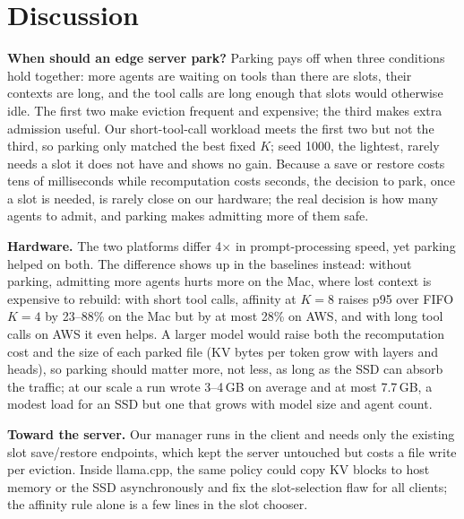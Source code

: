 \documentclass[conference,letterpaper]{IEEEtran}
\begin{document}
\section{Discussion}
\textbf{When should an edge server park?} Parking pays off when three conditions hold together: more agents are waiting on tools than there are slots, their contexts are long, and the tool calls are long enough that slots would otherwise idle. The first two make eviction frequent and expensive; the third makes extra admission useful. Our short-tool-call workload meets the first two but not the third, so parking only matched the best fixed $K$; seed 1000, the lightest, rarely needs a slot it does not have and shows no gain. Because a save or restore costs tens of milliseconds while recomputation costs seconds, the decision to park, once a slot is needed, is rarely close on our hardware; the real decision is how many agents to admit, and parking makes admitting more of them safe.

\textbf{Hardware.} The two platforms differ 4$\times$ in prompt-processing speed, yet parking helped on both. The difference shows up in the baselines instead: without parking, admitting more agents hurts more on the Mac, where lost context is expensive to rebuild: with short tool calls, affinity at $K=8$ raises p95 over FIFO $K=4$ by 23--88\% on the Mac but by at most 28\% on AWS, and with long tool calls on AWS it even helps. A larger model would raise both the recomputation cost and the size of each parked file (KV bytes per token grow with layers and heads), so parking should matter more, not less, as long as the SSD can absorb the traffic; at our scale a run wrote 3--4\,GB on average and at most 7.7\,GB, a modest load for an SSD but one that grows with model size and agent count.

\textbf{Toward the server.} Our manager runs in the client and needs only the existing slot save/restore endpoints, which kept the server untouched but costs a file write per eviction. Inside llama.cpp, the same policy could copy KV blocks to host memory or the SSD asynchronously and fix the slot-selection flaw for all clients; the affinity rule alone is a few lines in the slot chooser.
\end{document}
